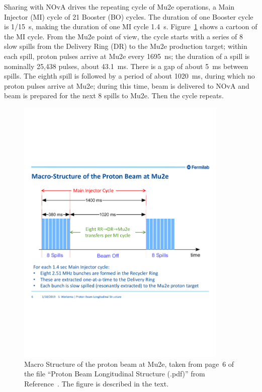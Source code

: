 Sharing with NOvA drives the repeating cycle of Mu2e operations, a Main Injector (MI) cycle of
21 Booster (BO) cycles.
The duration of one Booster cycle is 1/15~s,
making the duration of one MI cycle 1.4~s.
Figure~\ref{fig:beamMacroStructure} shows a cartoon of the MI cycle.
From the Mu2e point of view, the cycle starts with a series of 8 slow spills
from the Delivery Ring (DR) to the Mu2e production target;
within each spill, proton pulses arrive at Mu2e every 1695~ns;
the duration of a spill is nominally 25,438 pulses, about 43.1~ms.
There is a gap of about 5~ms between spills.
The eighth spill is followed by a period of about 1020~ms,
during which no proton pulses arrive at Mu2e;
during this time, beam is delivered to NOvA
and beam is prepared for the next 8 spills to Mu2e.
Then the cycle repeats.

\begin{figure}[tbp]
\centering
\includegraphics[width=0.9\textwidth]{figures/ProtonBeamLongitudinalStructure2019-01-10_page6.pdf}
\caption[Macro Structure of the Proton Beam at Mu2e]{
  Macro Structure of the proton beam at Mu2e, taken from page~6 of
  the file ``Proton Beam Longitudinal Structure (.pdf)'' from
  Reference~.  The figure is described in the text.}
\label{fig:beamMacroStructure}
\end{figure}

